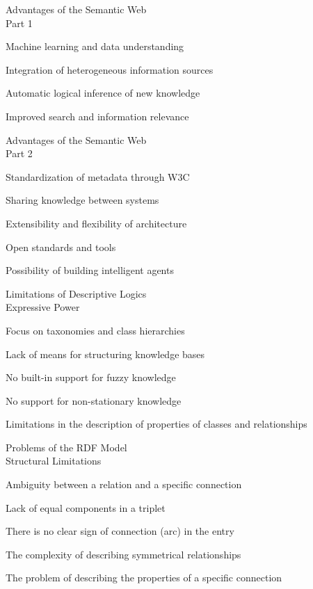 \begin{frame}{Advantages of the Semantic Web\\Part 1}
	\topline
	\justifying
	\begin{textitemize}
		\item Machine learning and data understanding
		\item Integration of heterogeneous information sources
		\item Automatic logical inference of new knowledge
		\item Improved search and information relevance
	\end{textitemize}
\end{frame}

\begin{frame}{Advantages of the Semantic Web\\Part 2}
	\topline
	\justifying
	\begin{textitemize}
		\item Standardization of metadata through W3C
		\item Sharing knowledge between systems
		\item Extensibility and flexibility of architecture
		\item Open standards and tools
		\item Possibility of building intelligent agents
	\end{textitemize}
\end{frame}

\begin{frame}{Limitations of Descriptive Logics\\Expressive Power}
	\topline
	\justifying
	\begin{textitemize}
		\item Focus on taxonomies and class hierarchies
		\item Lack of means for structuring knowledge bases
		\item No built-in support for fuzzy knowledge
		\item No support for non-stationary knowledge
		\item Limitations in the description of properties of classes and relationships
	\end{textitemize}
\end{frame}

\begin{frame}{Problems of the RDF Model\\Structural Limitations}
	\topline
	\justifying
	\begin{textitemize}
		\item Ambiguity between a relation and a specific connection
		\item Lack of equal components in a triplet
		\item There is no clear sign of connection (arc) in the entry
		\item The complexity of describing symmetrical relationships
		\item The problem of describing the properties of a specific connection
	\end{textitemize}
\end{frame}

